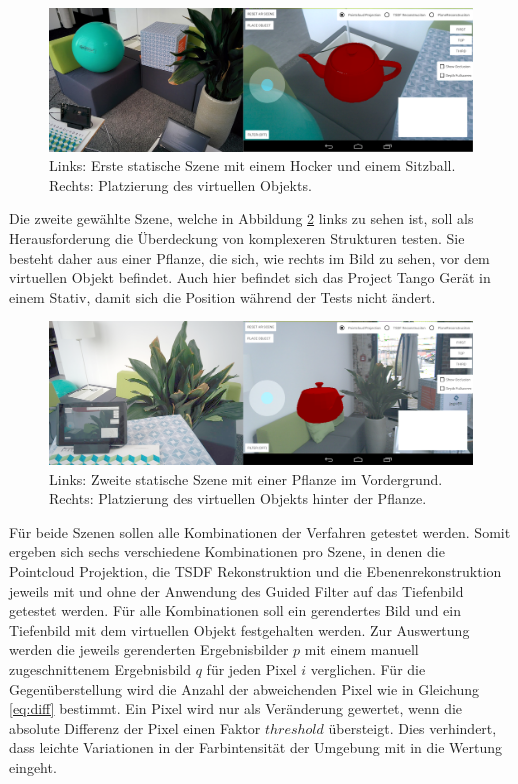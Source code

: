 \begin{figure}[h]
  \centering
	\includegraphics[width=1.0\textwidth]{content/images/evaluation/static-scene.png} 
  \caption{Links: Erste statische Szene mit einem Hocker und einem Sitzball. Rechts: Platzierung des virtuellen Objekts. }
  \label{fig:static-scene}
\end{figure}

Die zweite gewählte Szene, welche in Abbildung \ref{fig:plant-scene} links zu sehen ist, soll als Herausforderung die Überdeckung von komplexeren Strukturen testen. Sie besteht daher aus einer Pflanze, die sich, wie rechts im Bild zu sehen, vor dem virtuellen Objekt befindet. Auch hier befindet sich das Project Tango Gerät in einem Stativ, damit sich die Position während der Tests nicht ändert. 

\begin{figure}[h]
  \centering
	\includegraphics[width=1.0\textwidth]{content/images/evaluation/plant-scene.png} 
  \caption{Links: Zweite statische Szene mit einer Pflanze im Vordergrund. Rechts: Platzierung des virtuellen Objekts hinter der Pflanze. }
  \label{fig:plant-scene}
\end{figure}

Für beide Szenen sollen alle Kombinationen der Verfahren getestet werden. Somit ergeben sich sechs verschiedene Kombinationen pro Szene, in denen die Pointcloud Projektion, die TSDF Rekonstruktion und die Ebenenrekonstruktion jeweils mit und ohne der Anwendung des Guided Filter auf das Tiefenbild getestet werden. Für alle Kombinationen soll ein gerendertes Bild und ein Tiefenbild mit dem virtuellen Objekt festgehalten werden. Zur Auswertung werden die jeweils gerenderten Ergebnisbilder \(p\) mit einem manuell zugeschnittenem Ergebnisbild  \(q\) für jeden Pixel \(i\) verglichen. Für die Gegenüberstellung wird die Anzahl der abweichenden Pixel wie in Gleichung \ref{eq:diff} bestimmt. Ein Pixel wird nur als Veränderung gewertet, wenn die absolute Differenz der Pixel einen Faktor \(threshold\) übersteigt. Dies verhindert, dass leichte Variationen in der Farbintensität der Umgebung mit in die Wertung eingeht.

